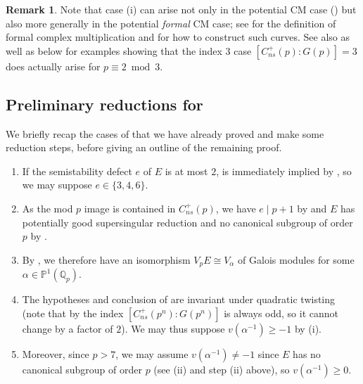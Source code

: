 \documentclass{amsart}
\newcommand{\Qp}{\mathbb{Q}_p}
\theoremstyle{definition}
\newtheorem{remark}[theorem]{Remark}
\numberwithin{theorem}{section}
\numberwithin{equation}{section}
\begin{document}
\begin{remark}\label{rmk: uniformity}
Note that case (i) can arise not only in the potential CM case () but also more generally in the potential \textit{formal} CM case; see \cite[\S1.1]{HMRL21} for the definition of formal complex multiplication and \cite[\S3.5]{lubintate} for how to construct such curves. See also \cite[Remark 3.2]{furiolombardo23} as well as  below for examples showing that the index 3 case $[C_{ns}^+(p) : G(p)]=3$ does actually arise for $p \equiv 2 \bmod 3$.
\end{remark}

\subsection{Preliminary reductions for }\label{subsec: preliminary reductions}

We briefly recap the cases of  that we have already proved and make some reduction steps, before giving an outline of the remaining proof.


\begin{enumerate}
    \item If the semistability defect $e$ of $E$ is at most $2$,  is immediately implied by , so we may suppose $e \in \{3,4,6\}.$
    \item As the mod $p$ image is contained in $C_{ns}^+(p)$, we have $e \mid p+1$ by  and $E$ has potentially good supersingular reduction and no canonical subgroup of order $p$ by .
    \item By , we therefore have an isomorphism $V_pE \cong V_{\alpha}$ of Galois modules for some $\alpha \in \mathbb{P}^1(\Qp)$.
    \item The hypotheses and conclusion of  are invariant under quadratic twisting (note that by  the index $[C_{ns}^+(p^n) : G(p^n)]$ is always odd, so it cannot change by a factor of $2$). We may thus suppose $v(\alpha^{-1}) \geq -1$ by (i).
    \item Moreover, since $p>7$, we may assume $v(\alpha^{-1}) \neq -1$ since $E$ has no canonical subgroup of order $p$ (see (ii) and step (ii) above), so $v(\alpha^{-1}) \geq 0$.
\end{enumerate}
\end{document}
